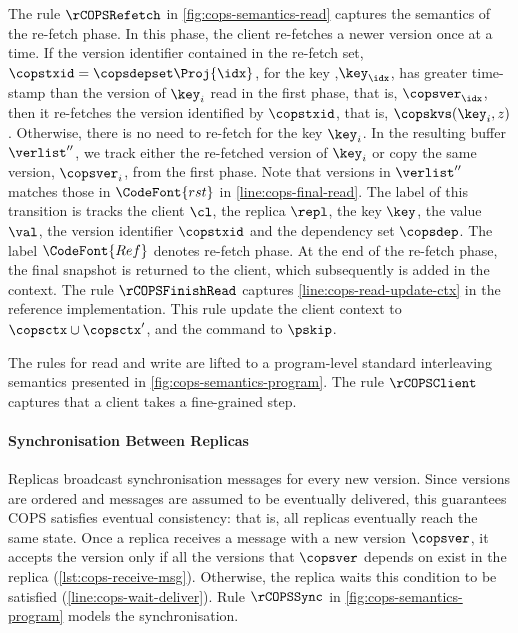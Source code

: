 The rule \(\rCOPSRefetch\) in \cref{fig:cops-semantics-read} captures the semantics of the re-fetch phase.
In this phase, the client re-fetches a newer version once at a time.
If the version identifier contained in the re-fetch set, \( \copstxid = \copsdepset\Proj{\idx} \),
for the key ,\( \key_\idx \), has greater time-stamp than the version of \( \key_i \) read in the first phase,
that is, \( \copsver_\idx \),
then it re-fetches the version identified by \( \copstxid \), that is, \(\copskvs(\key_i,z)\).
Otherwise, there is no need to re-fetch for the key \( \key_i \).
In the resulting buffer \( \verlist'' \),
we track either the re-fetched version of \( \key_i \)
or copy the same version, \( \copsver_i \), from the first phase.
Note that versions in \( \verlist'' \) matches those in \( \CodeFont{rst} \) in \cref{line:cops-final-read}.
The label of this transition is tracks the client \( \cl \), the replica \( \repl \), 
the key \( \key \), the value \( \val \), the version identifier \( \copstxid \) and the dependency set \( \copsdep \).
The label \( \CodeFont{Ref} \) denotes re-fetch phase.
At the end of the re-fetch phase,
the final snapshot is returned to the client, which subsequently is added in the context.
The rule \(\rCOPSFinishRead\) captures \cref{line:cops-read-update-ctx} in the reference implementation.
This rule update the client context to \( \copsctx \cup \copsctx'\),
and the command to \( \pskip \).

The rules for read and write are lifted to a program-level 
standard interleaving semantics presented in \cref{fig:cops-semantics-program}.
The rule \( \rCOPSClient \) captures that a client takes a fine-grained step.



\paragraph{Synchronisation Between Replicas}
Replicas broadcast synchronisation messages for every new version.
Since versions are ordered and messages are assumed to be eventually delivered,
this guarantees COPS satisfies eventual consistency: that is,
all replicas eventually reach the same state.
Once a replica receives a message with a new version \( \copsver \),
it accepts the version only if all the versions that \(\copsver \) depends on exist in the replica (\cref{lst:cops-receive-msg}).
Otherwise, the replica waits this condition to be satisfied (\cref{line:cops-wait-deliver}).
Rule \( \rCOPSSync \) in \cref{fig:cops-semantics-program} models the synchronisation.

